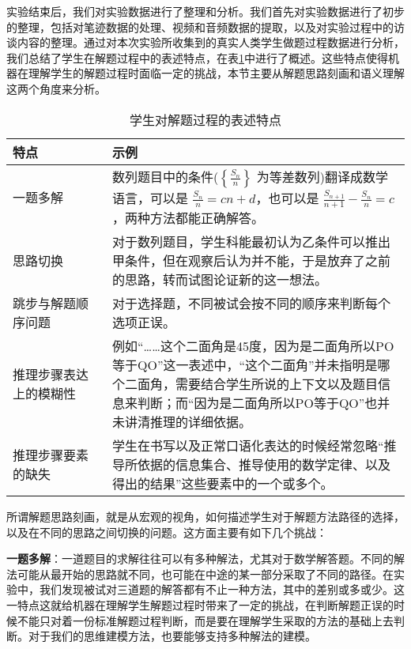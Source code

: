实验结束后，我们对实验数据进行了整理和分析。我们首先对实验数据进行了初步的整理，包括对笔迹数据的处理、视频和音频数据的提取，以及对实验过程中的访谈内容的整理。通过对本次实验所收集到的真实人类学生做题过程数据进行分析，我们总结了学生在解题过程中的表述特点，在表\ref{tab:biaoshutedian}中进行了概述。这些特点使得机器在理解学生的解题过程时面临一定的挑战，本节主要从解题思路刻画和语义理解这两个角度来分析。

\begin{table}
    \centering
    \caption{学生对解题过程的表述特点}
    \begin{tabular}{p{0.25\linewidth}p{0.75\linewidth}}
      \toprule
      \textbf{特点}             & \textbf{示例}                        \\
      \midrule
      一题多解         & 数列题目中的条件($\left\{\frac{S_n}{n}\right\}$ 为等差数列)翻译成数学语言，可以是 $\frac{S_n}{n} = cn+d$，也可以是 $\frac{S_{n+1}}{n+1} - \frac{S_n}{n} = c$，两种方法都能正确解答。 \\
      思路切换         & 对于数列题目，学生科能最初认为乙条件可以推出甲条件，但在观察后认为并不能，于是放弃了之前的思路，转而试图论证新的这一想法。                     \\
      跳步与解题顺序问题 & 对于选择题，不同被试会按不同的顺序来判断每个选项正误。    \\
      推理步骤表达上的模糊性 & 例如“……这个二面角是45度，因为是二面角所以PO等于QO”这一表述中，“这个二面角”并未指明是哪个二面角，需要结合学生所说的上下文以及题目信息来判断；而“因为是二面角所以PO等于QO”也并未讲清推理的详细依据。    \\
      推理步骤要素的缺失 & 学生在书写以及正常口语化表达的时候经常忽略“推导所依据的信息集合、推导使用的数学定律、以及得出的结果”这些要素中的一个或多个。    \\
      \bottomrule
    \end{tabular}
    \label{tab:biaoshutedian}
  \end{table}

所谓解题思路刻画，就是从宏观的视角，如何描述学生对于解题方法路径的选择，以及在不同的思路之间切换的问题。这方面主要有如下几个挑战：

\textbf{一题多解}：一道题目的求解往往可以有多种解法，尤其对于数学解答题。不同的解法可能从最开始的思路就不同，也可能在中途的某一部分采取了不同的路径。在实验中，我们发现被试对三道题的解答都有不止一种方法，其中的差别或多或少。这一特点这就给机器在理解学生解题过程时带来了一定的挑战，在判断解题正误的时候不能只对着一份标准解题过程判断，而是要在理解学生采取的方法的基础上去判断。对于我们的思维建模方法，也要能够支持多种解法的建模。

